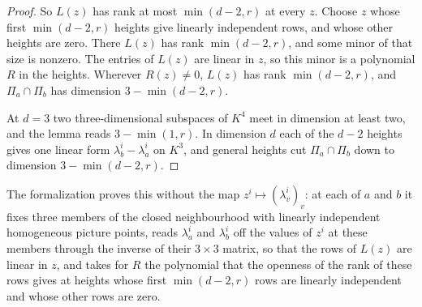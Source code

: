 \begin{proof}
  So $L(z)$ has rank at most $\min(d - 2, r)$ at every $z$. Choose $z$
  whose first $\min(d - 2, r)$ heights give linearly independent rows,
  and whose other heights are zero. There $L(z)$ has rank
  $\min(d - 2, r)$, and some minor of that size is nonzero. The entries
  of $L(z)$ are linear in $z$, so this minor is a polynomial $R$ in the
  heights. Wherever $R(z) \neq 0$, $L(z)$ has rank $\min(d - 2, r)$, and
  $\Pi_a \cap \Pi_b$ has dimension $3 - \min(d - 2, r)$.

  At $d = 3$ two three-dimensional subspaces of $K^4$ meet in dimension
  at least two, and the lemma reads $3 - \min(1, r)$. In dimension $d$
  each of the $d - 2$ heights gives one linear form
  $\lambda^i_b - \lambda^i_a$ on $K^3$, and general heights cut
  $\Pi_a \cap \Pi_b$ down to dimension $3 - \min(d - 2, r)$.
\end{proof}

\begin{fmlnote}
  The formalization proves this without the map
  $z^i \mapsto (\lambda^i_v)_v$: at each of $a$ and $b$ it fixes three
  members of the closed neighbourhood with linearly independent
  homogeneous picture points, reads $\lambda^i_a$ and $\lambda^i_b$ off
  the values of $z^i$ at these members through the inverse of their
  $3 \times 3$ matrix, so that the rows of $L(z)$ are linear in $z$, and
  takes for $R$ the polynomial that the openness of the rank of these
  rows gives at heights whose first $\min(d - 2, r)$ rows are linearly
  independent and whose other rows are zero.
\end{fmlnote}

